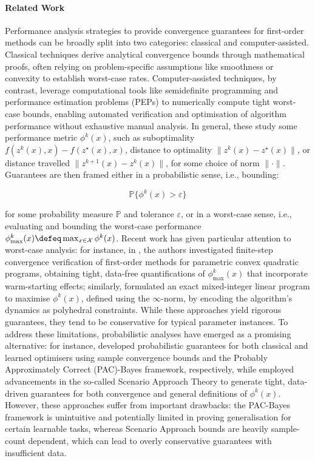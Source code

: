\paragraph{Related Work}
Performance analysis strategies to provide convergence guarantees for first-order methods can be broadly split into two categories: classical and computer-assisted. Classical techniques derive analytical convergence bounds through mathematical proofs, often relying on problem-specific assumptions like smoothness or convexity to establish worst-case rates. Computer-assisted techniques, by contrast, leverage computational tools like semidefinite programming and performance estimation problems (PEPs) to numerically compute tight worst-case bounds, enabling automated verification and optimisation of algorithm performance without exhaustive manual analysis. In general, these study some performance metric $\phi^k(x)$, such as suboptimality $f(z^k(x),x) - f(z^\star(x),x)$, distance to optimality $\|z^k(x) - z^\star(x)\|$, or distance travelled $\|z^{k+1}(x) - z^k(x)\|$, for some choice of norm $\|\cdot\|$.
Guarantees are then framed either in a probabilistic sense, i.e., bounding:

\begin{equation}\label{eq:probabilistic_guarantee}
\mathbb{P}\{\phi^k(x) > \varepsilon\}
\end{equation}

for some probability measure $\mathbb{P}$ and tolerance $\varepsilon$, or in a worst-case sense, i.e., evaluating and bounding the worst-case performance $\phi^k_{\max}(x) \defeq \max_{x\in\mathcal{X}} \phi^k(x)$. Recent work has given particular attention to worst-case analysis: for instance, in \cite{VRBS25}, the authors investigated finite-step convergence verification of first-order methods for parametric convex quadratic programs, obtaining tight, data-free quantifications of $\phi^k_{\max}(x)$ that incorporate warm-starting effects; similarly, \cite{VRBS+24} formulated an exact mixed-integer linear program to maximise $\phi^k(x)$, defined using the $\infty$-norm, by encoding the algorithm’s dynamics as polyhedral constraints. While these approaches yield rigorous guarantees, they tend to be conservative for typical parameter instances. To address these limitations, probabilistic analyses have emerged as a promising alternative: for instance, \cite{RSBS25} developed probabilistic guarantees for both classical and learned optimisers using sample convergence bounds and the Probably Approximately Correct (PAC)-Bayes framework, respectively, while \cite{JHKM+25} employed advancements in the so-called Scenario Approach Theory to generate tight, data-driven guarantees for both convergence and general definitions of $\phi^k(x)$. However, these approaches suffer from important drawbacks: the PAC-Bayes framework is unintuitive and potentially limited in proving generalisation for certain learnable tasks, whereas Scenario Approach bounds are heavily sample-count dependent, which can lead to overly conservative guarantees with insufficient data.